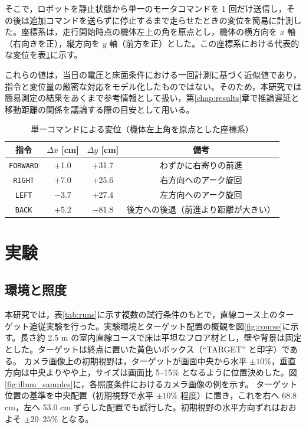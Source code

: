 \documentclass[a4paper,11pt]{ltjsreport}
\begin{document}
そこで，ロボットを静止状態から単一のモータコマンドを 1 回だけ送信し，その後は追加コマンドを送らずに停止するまで走らせたときの変位を簡易に計測した。座標系は，走行開始時点の機体左上の角を原点とし，機体の横方向を $x$ 軸（右向きを正），縦方向を $y$ 軸（前方を正）とした。この座標系における代表的な変位を表\ref{tab:single_cmd}に示す。

これらの値は，当日の電圧と床面条件における一回計測に基づく近似値であり，指令と変位量の厳密な対応をモデル化したものではない。そのため，本研究では簡易測定の結果をあくまで参考情報として扱い，第\ref{chap:results}章で推論遅延と移動距離の関係を議論する際の目安として用いる。

\begin{table}[htbp]
  \centering
  \caption{単一コマンドによる変位（機体左上角を原点とした座標系）}
  \label{tab:single_cmd}
  \begin{tabular}{|c|c|c|c|}
    \hline
    指令 & $\Delta x$ [cm] & $\Delta y$ [cm] & 備考 \\
    \hline
    \texttt{FORWARD} & +1.0 & +31.7 & わずかに右寄りの前進 \\
    \texttt{RIGHT}   & +7.0 & +25.6 & 右方向へのアーク旋回 \\
    \texttt{LEFT}    & $-3.7$ & +27.4 & 左方向へのアーク旋回 \\
    \texttt{BACK}    & +5.2 & $-81.8$ & 後方への後退（前進より距離が大きい） \\
    \hline
  \end{tabular}
\end{table}

\chapter{実験}
\label{chap:experiments}

\section{環境と照度}
本研究では，表\ref{tab:runs}に示す複数の試行条件のもとで，直線コース上のターゲット追従実験を行った。実験環境とターゲット配置の概観を図\ref{fig:course}に示す。長さ約 2.5 m の室内直線コースで床は平坦なフロア材とし，壁や背景は固定とした。ターゲットは終点に置いた黄色いボックス（“TARGET” と印字）である。
カメラ画像上の初期視野は，ターゲットが画面中央から水平 $\pm 10\%$，垂直方向は中央よりやや上，サイズは画面比 5--15\% となるように位置決めした。図\ref{fig:illum_samples}に，各照度条件におけるカメラ画像の例を示す。
ターゲット位置の基準を中央配置（初期視野で水平 $\pm 10\%$ 程度）に置き，これを右へ 68.8 cm，左へ 53.0 cm ずらした配置でも試行した。初期視野の水平方向ずれはおおよそ $\pm 20$--$25\%$ となる。
\end{document}
